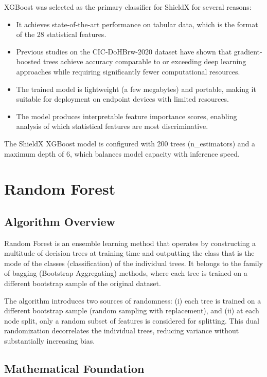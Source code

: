 \documentclass[../Main.tex]{subfiles}
\begin{document}
XGBoost was selected as the primary classifier for ShieldX for several reasons:
\begin{itemize}
    \item It achieves state-of-the-art performance on tabular data, which is the format of the 28 statistical features.
    \item Previous studies on the CIC-DoHBrw-2020 dataset have shown that gradient-boosted trees achieve accuracy comparable to or exceeding deep learning approaches while requiring significantly fewer computational resources.
    \item The trained model is lightweight (a few megabytes) and portable, making it suitable for deployment on endpoint devices with limited resources.
    \item The model produces interpretable feature importance scores, enabling analysis of which statistical features are most discriminative.
\end{itemize}

The ShieldX XGBoost model is configured with 200 trees (n\_estimators) and a maximum depth of 6, which balances model capacity with inference speed.

\section{Random Forest}
\label{section:3.4}

\subsection{Algorithm Overview}

Random Forest \cite{breiman2001random} is an ensemble learning method that operates by constructing a multitude of decision trees at training time and outputting the class that is the mode of the classes (classification) of the individual trees. It belongs to the family of bagging (Bootstrap Aggregating) methods, where each tree is trained on a different bootstrap sample of the original dataset.

The algorithm introduces two sources of randomness: (i) each tree is trained on a different bootstrap sample (random sampling with replacement), and (ii) at each node split, only a random subset of features is considered for splitting. This dual randomization decorrelates the individual trees, reducing variance without substantially increasing bias.

\subsection{Mathematical Foundation}
\end{document}
